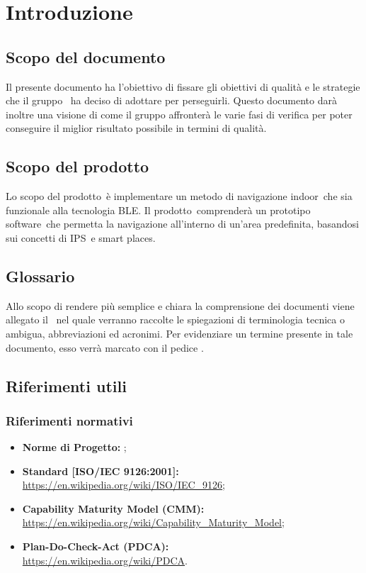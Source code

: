 \documentclass[../PianoDiQualifica.tex]{subfiles}
\begin{document}
\section{Introduzione}
	\subsection{Scopo del documento}
	Il presente documento ha l'obiettivo di fissare gli obiettivi di qualità e le strategie che il gruppo \leaf\ ha deciso di adottare per perseguirli. Questo documento darà inoltre una visione di come il gruppo affronterà le varie fasi di verifica per poter conseguire il miglior risultato possibile in termini di qualità.
	\subsection{Scopo del prodotto}
	Lo scopo del prodotto\g\ è implementare un metodo di navigazione indoor\g\ che sia funzionale alla tecnologia BLE\g.
	Il prodotto\g\ comprenderà un prototipo software\g\ che permetta la navigazione all'interno di un'area predefinita, basandosi sui concetti di IPS\g\ e smart places\g.
	\subsection{Glossario}
	Allo scopo di rendere più semplice e chiara la comprensione dei documenti viene allegato il \glossariov\ nel quale verranno raccolte le spiegazioni di  terminologia tecnica o ambigua,
abbreviazioni ed acronimi. Per evidenziare un termine presente in tale documento, esso verrà marcato con il pedice \g.
	\subsection{Riferimenti utili}
		\subsubsection{Riferimenti normativi}
		\begin{itemize}
			\item \textbf{Norme di Progetto:} \normediprogettov;
			\item \textbf{Standard [ISO/IEC 9126:2001]:} \\\url{https://en.wikipedia.org/wiki/ISO/IEC\_9126};
			\item \textbf{Capability Maturity Model (CMM\g):} \\\url{https://en.wikipedia.org/wiki/Capability\_Maturity\_Model};
			\item \textbf{Plan-Do-Check-Act (PDCA\g):} \\\url{https://en.wikipedia.org/wiki/PDCA}.
		\end{itemize}
\end{document}

